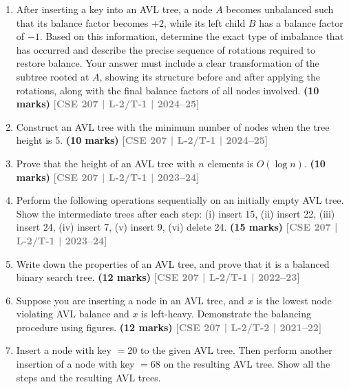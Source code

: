 \documentclass[12pt,a3paper]{article}
\newcommand{\yr}[1]{\hfill\textcolor{gray}{\small\textbf{[#1]}}}
\newcommand{\mk}[1]{\textcolor{orange!70!black}{\small\textbf{(#1 marks)}}}
\begin{document}
\begin{enumerate}

\item After inserting a key into an AVL tree, a node $A$ becomes unbalanced such that its balance factor becomes $+2$, while its left child $B$ has a balance factor of $-1$. Based on this information, determine the exact type of imbalance that has occurred and describe the precise sequence of rotations required to restore balance. Your answer must include a clear transformation of the subtree rooted at $A$, showing its structure before and after applying the rotations, along with the final balance factors of all nodes involved.
\mk{10} \yr{CSE 207 | L-2/T-1 | 2024--25}

\item Construct an AVL tree with the minimum number of nodes when the tree height is 5.
\mk{10} \yr{CSE 207 | L-2/T-1 | 2024--25}

\item Prove that the height of an AVL tree with $n$ elements is $O(\log n)$.
\mk{10} \yr{CSE 207 | L-2/T-1 | 2023--24}

\item Perform the following operations sequentially on an initially empty AVL tree. Show the intermediate trees after each step: (i) insert 15, (ii) insert 22, (iii) insert 24, (iv) insert 7, (v) insert 9, (vi) delete 24.
\mk{15} \yr{CSE 207 | L-2/T-1 | 2023--24}

\item Write down the properties of an AVL tree, and prove that it is a balanced binary search tree.
\mk{12} \yr{CSE 207 | L-2/T-1 | 2022--23}

\item Suppose you are inserting a node in an AVL tree, and $x$ is the lowest node violating AVL balance and $x$ is left-heavy. Demonstrate the balancing procedure using figures.
\mk{12} \yr{CSE 207 | L-2/T-2 | 2021--22}

\item Insert a node with key $= 20$ to the given AVL tree. Then perform another insertion of a node with key $= 68$ on the resulting AVL tree. Show all the steps and the resulting AVL trees.
\begin{center}
\begin{tikzpicture}[
        every node/.style={circle, draw=black, thick, minimum size=0.8cm, font=\large, inner sep=0pt},
        edge/.style={thick, black}
    ]


\end{tikzpicture}
\end{center}
\end{enumerate}
\end{document}
